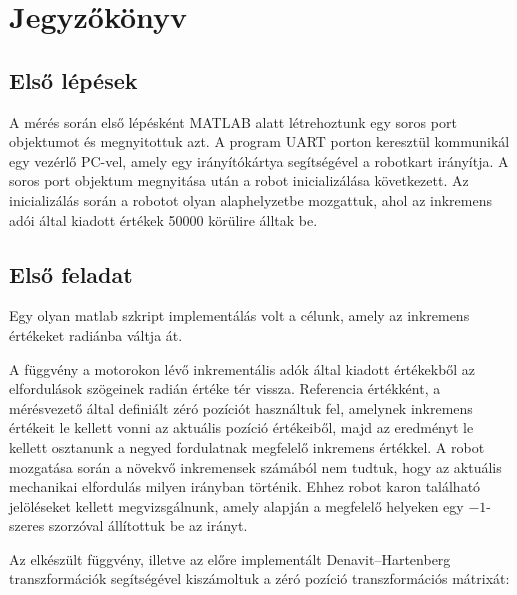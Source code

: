 \chapter{Jegyzőkönyv}
\section{Első lépések}
A mérés során első lépésként MATLAB alatt létrehoztunk egy soros port objektumot és megnyitottuk azt. A program UART porton keresztül kommunikál egy vezérlő PC-vel, amely egy irányítókártya segítségével a robotkart irányítja. A soros port objektum megnyitása után a robot inicializálása következett. Az inicializálás során a robotot olyan alaphelyzetbe mozgattuk, ahol az inkremens adói által kiadott értékek 50000 körülire álltak be.


\section{Első feladat}
Egy olyan matlab szkript implementálás volt a célunk, amely az inkremens értékeket radiánba váltja át.


A függvény a motorokon lévő inkrementális adók által kiadott értékekből az elfordulások szögeinek radián értéke tér vissza. Referencia értékként, a mérésvezető által definiált zéró pozíciót használtuk fel, amelynek inkremens értékeit le kellett vonni az aktuális pozíció értékeiből, majd az eredményt le kellett osztanunk a negyed fordulatnak megfelelő inkremens értékkel.
A robot mozgatása során a növekvő inkremensek számából nem tudtuk, hogy az aktuális mechanikai elfordulás milyen irányban történik. Ehhez robot karon található jelöléseket kellett megvizsgálnunk, amely alapján a megfelelő helyeken egy $ -1 $-szeres szorzóval állítottuk be az irányt.

Az elkészült függvény, illetve az előre implementált Denavit–Hartenberg transzformációk segítségével kiszámoltuk a zéró pozíció transzformációs mátrixát:


